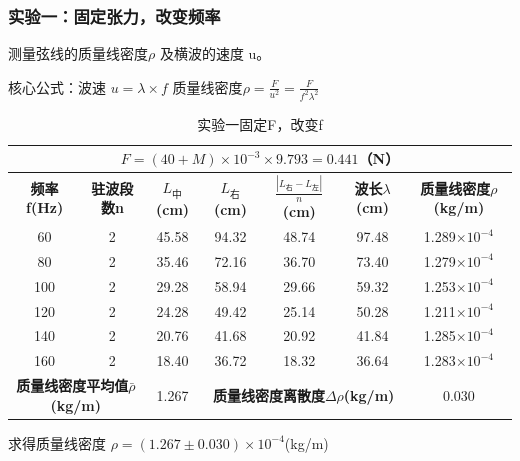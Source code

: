 \documentclass[]{../../templates/Report}%
\begin{document}
\begin{fullreportonly}
\subsubsection{实验一：固定张力，改变频率}
测量弦线的质量线密度$\rho$ 及横波的速度 u。
\par
核心公式：波速 $u = \lambda \times f$ \quad 质量线密度$\rho = \frac{F}{u^2} = \frac{F}{f^2\lambda^2}$
\par
\begin{table}[H]
    \centering
    \caption{实验一固定F，改变f}
    \begin{tabular}{|c|c|c|c|c|c|c|}
        \hline
        \multicolumn{7}{|c|}{$F = (40 + M) \times 10^{-3} \times 9.793 = 0.441$（N）}  \\
        \hline
        \textbf{频率f(Hz)} & \textbf{驻波段数n} & \textbf{$L_\text{中}$(cm)} & \textbf{$L_\textbf{右}$(cm)} & \textbf{$\frac{|L_\textbf{右} - L_\textbf{左}|}{n}$(cm)} & \textbf{波长$\lambda$(cm)} & \textbf{质量线密度$\rho$(kg/m)}  \\
        \hline
        60 & 2 & 45.58 & 94.32 & 48.74 & 97.48 & 1.289$\times 10^{-4}$  \\
        \hline
        80 & 2 & 35.46 & 72.16 & 36.70 & 73.40 & 1.279$\times 10^{-4}$  \\
        \hline
        100 & 2 & 29.28 & 58.94 & 29.66 & 59.32 & 1.253$\times 10^{-4}$  \\
        \hline
        120 & 2 & 24.28 & 49.42 & 25.14 & 50.28 & 1.211$\times 10^{-4}$  \\
        \hline
        140 & 2 & 20.76 & 41.68 & 20.92 & 41.84 & 1.285$\times 10^{-4}$  \\
        \hline
        160 & 2 & 18.40 & 36.72 & 18.32 & 36.64 & 1.283$\times 10^{-4}$  \\
        \hline
        \multicolumn{2}{|c|}{\textbf{质量线密度平均值$\bar \rho$(kg/m)}} & 1.267 &
        \multicolumn{3}{|c|}{\textbf{质量线密度离散度$\Delta \rho$(kg/m)}} & 0.030  \\
        \hline
    \end{tabular}
\end{table}
求得质量线密度 $\rho = (1.267 \pm 0.030) \times 10^{-4}$(kg/m)


\end{fullreportonly}
\end{document}
